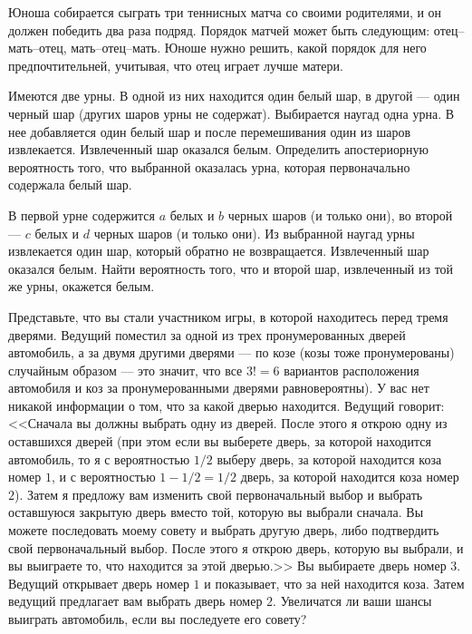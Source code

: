 \begin{problem}
Юноша собирается сыграть три теннисных матча со своими родителями, и он должен победить два раза подряд. 
Порядок матчей может быть следующим: отец--мать--отец, мать--отец--мать. Юноше нужно решить, какой порядок для него предпочтительней, 
учитывая, что отец играет лучше матери.

\end{problem}


\begin{problem}
Имеются две урны. В одной из них находится один белый шар, в другой --- один черный шар (других шаров урны не содержат). Выбирается 
наугад одна урна. В нее добавляется один белый шар и после перемешивания один из шаров извлекается. Извлеченный шар оказался белым. 
Определить апостериорную вероятность того, что выбранной оказалась урна, которая первоначально содержала белый шар. 
\end{problem}


\begin{problem}
В первой урне содержится $a$ белых и $b$ черных шаров (и только они), во второй --- $c$ белых и $d$ черных шаров 
(и только они). Из выбранной наугад урны извлекается один шар, который обратно не возвращается. Извлеченный шар оказался белым. 
Найти вероятность того, что и второй шар, извлеченный из той же урны, окажется белым. 
\end{problem}

\begin{problem}
Представьте, что вы стали участником игры, в которой находитесь перед тремя дверями. Ведущий поместил за одной из трех 
пронумерованных дверей автомобиль, а за двумя другими дверями --- по козе (козы тоже пронумерованы) случайным образом --– это значит, 
что все $3! = 6$ вариантов расположения автомобиля и коз за пронумерованными дверями равновероятны). У вас нет никакой информации 
о том, что за какой дверью находится. Ведущий говорит: <<Сначала вы должны выбрать одну из дверей. После этого я открою одну из 
оставшихся дверей (при этом если вы выберете дверь, за которой находится автомобиль, то я с вероятностью $1/2$ выберу дверь, 
за которой находится коза номер $1$, и с вероятностью $1-1/2=1/2$ дверь, за которой находится коза номер $2$). Затем я предложу 
вам изменить свой первоначальный выбор и выбрать оставшуюся закрытую дверь вместо той, которую вы выбрали сначала. Вы можете 
последовать моему совету и выбрать другую дверь, либо подтвердить свой первоначальный выбор. После этого я открою дверь, 
которую вы выбрали, и вы выиграете то, что находится за этой дверью.>> Вы выбираете дверь номер $3$. Ведущий открывает дверь номер $1$ 
и показывает, что за ней находится коза. Затем ведущий предлагает вам выбрать дверь номер $2$. Увеличатся ли ваши шансы 
выиграть автомобиль, если вы последуете его совету? 
\end{problem}


